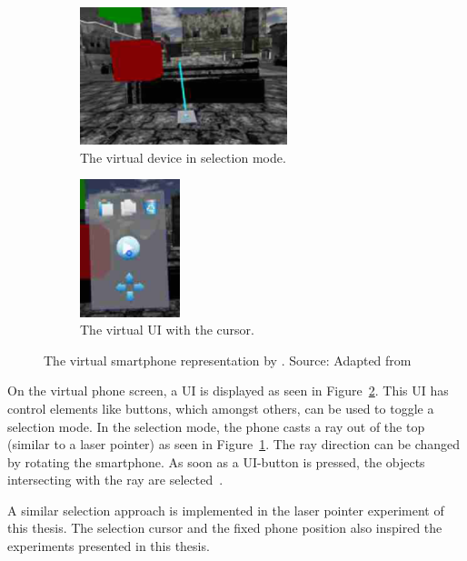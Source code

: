 \begin{figure}[H]
	\centering
	\begin{subfigure}[t]{0.45\textwidth}%
		\centering%
		\includegraphics[height=4cm]{figures/related_work/steed_2013_laser_pointer.png}
		\caption{The virtual device in selection mode.}\label{fig:steed-2013-laser-pointer}%
	\end{subfigure}%
	\hspace{0.1\textwidth}%
	\begin{subfigure}[t]{0.45\textwidth}%
		\centering%
		\includegraphics[height=4cm]{figures/related_work/steed_2013_ui.png}
		\caption{The virtual \gls{UI} with the cursor.}\label{fig:steed-2013-ui}
	\end{subfigure}%
  \caption[Virtual smartphone representation by Steed et al.]{The virtual smartphone representation by \citeauthor{Steed.2013}.
  \newline{}
  Source: Adapted from~\protect\cite[Figure 1]{Steed.2013}
  }\label{fig:steed-2013}
\end{figure}

On the virtual phone screen, a \gls{UI} is displayed as seen in Figure~\ref{fig:steed-2013-ui}. This \gls{UI} has control elements like buttons, which amongst others, can be used to toggle a selection mode. In the selection mode, the phone casts a ray out of the top (similar to a laser pointer) as seen in Figure~\ref{fig:steed-2013-laser-pointer}. The ray direction can be changed by rotating the smartphone. As soon as a \gls{UI}-button is pressed, the objects intersecting with the ray are selected~\cite{Steed.2013}.

A similar selection approach is implemented in the laser pointer experiment of this thesis. The selection cursor and the fixed phone position also inspired the experiments presented in this thesis.


